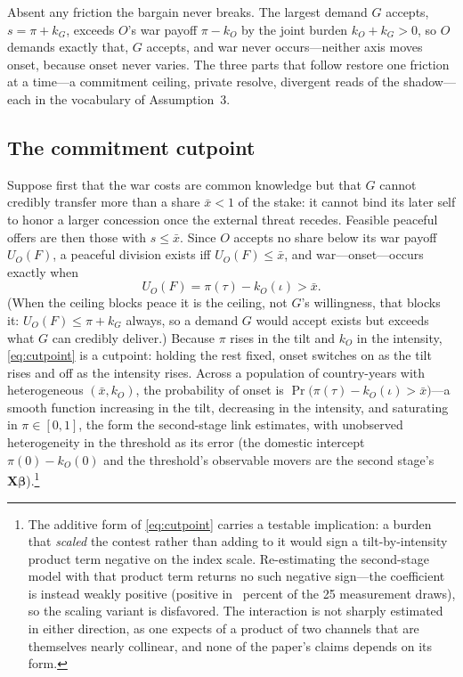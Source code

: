 Absent any friction the bargain never breaks.  The largest demand $G$
accepts, $s = \pi + k_G$, exceeds $O$'s war payoff $\pi - k_O$ by the joint
burden $k_O + k_G > 0$, so $O$ demands exactly that, $G$ accepts, and war
never occurs---neither axis moves onset, because onset never varies.  The
three parts that follow restore one friction at a time---a commitment
ceiling, private resolve, divergent reads of the shadow---each in the
vocabulary of Assumption~3.

\subsection{The commitment cutpoint}
\label{app:commit}

Suppose first that the war costs are common knowledge but that $G$ cannot
credibly transfer more than a share $\bar{x} < 1$ of the stake: it cannot bind
its later self to honor a larger concession once the external threat recedes.
Feasible peaceful offers are then those with $s \le \bar{x}$.  Since $O$
accepts no share below its war payoff $U_O(F)$, a peaceful division exists iff
$U_O(F) \le \bar{x}$, and war---onset---occurs exactly when
\begin{equation}
  U_O(F) = \pi(\tau) - k_O(\iota) > \bar{x}. \label{eq:cutpoint}
\end{equation}
(When the ceiling blocks peace it is the ceiling, not $G$'s willingness, that
blocks it: $U_O(F) \le \pi + k_G$ always, so a demand $G$ would accept exists
but exceeds what $G$ can credibly deliver.)  Because $\pi$ rises in the tilt
and $k_O$ in the intensity, \eqref{eq:cutpoint} is a cutpoint: holding the rest
fixed, onset switches on as the tilt rises and off as the intensity rises.
Across a population of country-years with heterogeneous $(\bar{x}, k_O)$, the
probability of onset is
$\Pr\!\big(\pi(\tau) - k_O(\iota) > \bar{x}\big)$---a smooth function
increasing in the tilt, decreasing in the intensity, and saturating in $\pi \in
[0,1]$, the form the second-stage link estimates, with unobserved
heterogeneity in the threshold as its error (the domestic intercept
$\pi(0) - k_O(0)$ and the threshold's observable movers are the second
stage's $\mathbf{X}\boldsymbol{\beta}$).\footnote{The additive form of \eqref{eq:cutpoint} carries a testable implication: a burden that \emph{scaled} the contest rather than adding to it would sign a tilt-by-intensity product term negative on the index scale. Re-estimating the second-stage model with that product term returns no such negative sign---the coefficient is instead weakly positive (positive in \DirInterFrac\ percent of the 25 measurement draws), so the scaling variant is disfavored. The interaction is not sharply estimated in either direction, as one expects of a product of two channels that are themselves nearly collinear, and none of the paper's claims depends on its form.}

